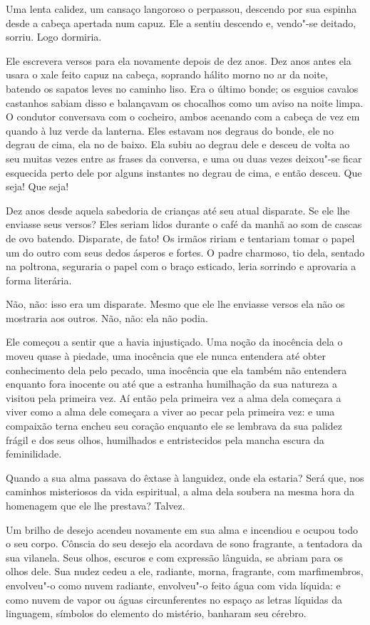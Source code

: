 Uma lenta calidez, um cansaço langoroso o perpassou, descendo por sua
espinha desde a cabeça apertada num capuz. Ele a sentiu descendo e,
vendo"-se deitado, sorriu. Logo dormiria.

Ele escrevera versos para ela novamente depois de dez anos. Dez anos
antes ela usara o xale feito capuz na cabeça, soprando hálito morno no
ar da noite, batendo os sapatos leves no caminho liso. Era o último
bonde; os esguios cavalos castanhos sabiam disso e balançavam os
chocalhos como um aviso na noite limpa. O condutor conversava com o
cocheiro, ambos acenando com a cabeça de vez em quando à luz verde da
lanterna. Eles estavam nos degraus do bonde, ele no degrau de cima, ela
no de baixo. Ela subiu ao degrau dele e desceu de volta ao seu muitas
vezes entre as frases da conversa, e uma ou duas vezes deixou"-se ficar
esquecida perto dele por alguns instantes no degrau de cima, e então
desceu. Que seja! Que seja!

Dez anos desde aquela sabedoria de crianças até seu atual disparate. Se
ele lhe enviasse seus versos? Eles seriam lidos durante o café da manhã
ao som de cascas de ovo batendo. Disparate, de fato! Os irmãos ririam e
tentariam tomar o papel um do outro com seus dedos ásperos e fortes. O
padre charmoso, tio dela, sentado na poltrona, seguraria o papel com o
braço esticado, leria sorrindo e aprovaria a forma literária.

Não, não: isso era um disparate. Mesmo que ele lhe enviasse versos ela
não os mostraria aos outros. Não, não: ela não podia.

Ele começou a sentir que a havia injustiçado. Uma noção da inocência
dela o moveu quase à piedade, uma inocência que ele nunca entendera até
obter conhecimento dela pelo pecado, uma inocência que ela também não
entendera enquanto fora inocente ou até que a estranha humilhação da
sua natureza a visitou pela primeira vez. Aí então pela primeira vez a
alma dela começara a viver como a alma dele começara a viver ao pecar
pela primeira vez: e uma compaixão terna encheu seu coração enquanto
ele se lembrava da sua palidez frágil e dos seus olhos, humilhados e
entristecidos pela mancha escura da feminilidade.

Quando a sua alma passava do êxtase à languidez, onde ela estaria? Será
que, nos caminhos misteriosos da vida espiritual, a alma dela soubera
na mesma hora da homenagem que ele lhe prestava? Talvez.

Um brilho de desejo acendeu novamente em sua alma e incendiou e ocupou
todo o seu corpo. Cônscia do seu desejo ela acordava de sono fragrante,
a tentadora da sua vilanela. Seus olhos, escuros e com expressão
lânguida, se abriam para os olhos dele. Sua nudez cedeu a ele,
radiante, morna, fragrante, com marfimembros, envolveu"-o como nuvem    
radiante, envolveu"-o feito água com vida líquida: e como nuvem de vapor
ou águas circunferentes no espaço as letras líquidas da linguagem,
símbolos do elemento do mistério, banharam seu cérebro.

